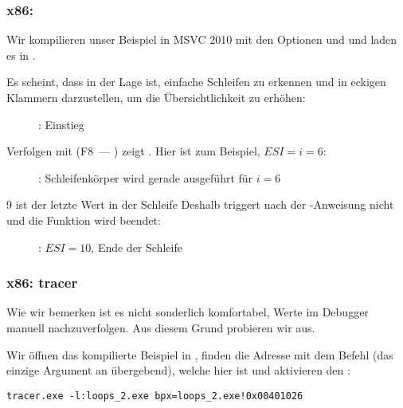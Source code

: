 \clearpage
\subsubsection{x86: \olly}
\myindex{\olly}

Wir kompilieren unser Beispiel in MSVC 2010 mit den Optionen \Ox und \Obzero und
laden es in \olly.

Es scheint, dass \olly in der Lage ist, einfache Schleifen zu erkennen und in
eckigen Klammern darzustellen, um die Übersichtlichkeit zu erhöhen:

\begin{figure}[H]
\centering
{}
\caption{\olly: \main Einstieg}
\label{fig:loops_olly_1}
\end{figure}

Verfolgen mit (F8~--- \stepover) zeigt \ESI 
{}.
Hier ist zum Beispiel, $ESI=i=6$:

\begin{figure}[H]
\centering
{}
\caption{\olly: Schleifenkörper wird gerade ausgeführt für $i=6$}
\label{fig:loops_olly_2}
\end{figure}

9 ist der letzte Wert in der Schleife
Deshalb triggert \JL nach der -Anweisung nicht und die Funktion
wird beendet:

\begin{figure}[H]
\centering
{}
\caption{\olly: $ESI=10$, Ende der Schleife}
\label{fig:loops_olly_3}
\end{figure}

\subsubsection{x86: tracer}

Wie wir bemerken ist es nicht sonderlich komfortabel, Werte im Debugger manuell
nachzuverfolgen. Aus diesem Grund probieren wir \tracer aus.

Wir öffnen das kompilierte Beispiel in \IDA, finden die Adresse mit dem Befehl
 (das einzige Argument an \ttf übergebend), welche hier
 ist und aktivieren den \tracer:

\begin{lstlisting}
tracer.exe -l:loops_2.exe bpx=loops_2.exe!0x00401026
\end{lstlisting}


